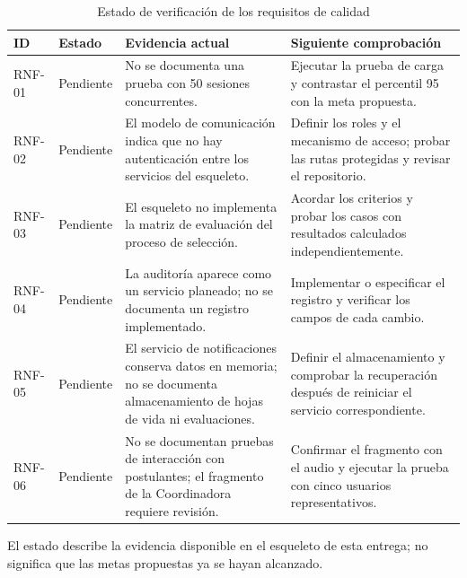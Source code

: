 \begin{table}[H]
\centering
\small
\caption{Estado de verificación de los requisitos de calidad}
\begin{tabularx}{\linewidth}{@{}p{1cm}p{1.6cm}XX@{}}
\toprule
\textbf{ID} & \textbf{Estado} & \textbf{Evidencia actual} & \textbf{Siguiente comprobación} \\
\midrule
RNF-01 & Pendiente &
No se documenta una prueba con 50 sesiones concurrentes. &
Ejecutar la prueba de carga y contrastar el percentil 95 con la meta propuesta. \\

RNF-02 & Pendiente &
El modelo de comunicación indica que no hay autenticación entre los servicios del esqueleto. &
Definir los roles y el mecanismo de acceso; probar las rutas protegidas y revisar el repositorio. \\

RNF-03 & Pendiente &
El esqueleto no implementa la matriz de evaluación del proceso de selección. &
Acordar los criterios y probar los casos con resultados calculados independientemente. \\

RNF-04 & Pendiente &
La auditoría aparece como un servicio planeado; no se documenta un registro implementado. &
Implementar o especificar el registro y verificar los campos de cada cambio. \\

RNF-05 & Pendiente &
El servicio de notificaciones conserva datos en memoria; no se documenta almacenamiento de hojas de vida ni evaluaciones. &
Definir el almacenamiento y comprobar la recuperación después de reiniciar el servicio correspondiente. \\

RNF-06 & Pendiente &
No se documentan pruebas de interacción con postulantes; el fragmento de la Coordinadora requiere revisión. &
Confirmar el fragmento con el audio y ejecutar la prueba con cinco usuarios representativos. \\
\bottomrule
\end{tabularx}
\end{table}

El estado describe la evidencia disponible en el esqueleto de esta entrega; no significa que las metas propuestas ya se hayan alcanzado.